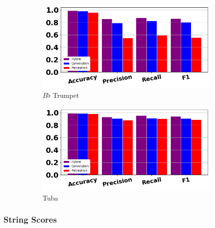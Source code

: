 \documentclass[12pt,letterpaper]{article}
\begin{document}
\begin{figure}[H]
	\begin{subfigure}[b]{0.45\textwidth}
	\centering
	\includegraphics[width=\textwidth]{../FiguresClasses/Trumpet}
	\caption{$B\flat$ Trumpet}
	\end{subfigure}
	\hfill
	\begin{subfigure}[b]{0.45\textwidth}
	\centering
	\includegraphics[width=\textwidth]{../FiguresClasses/Tuba}
	\caption{Tuba}
	\end{subfigure}
	
\caption{}
\label{fig-BrassScores}
\end{figure}


\subsubsection{String Scores}
\end{document}
